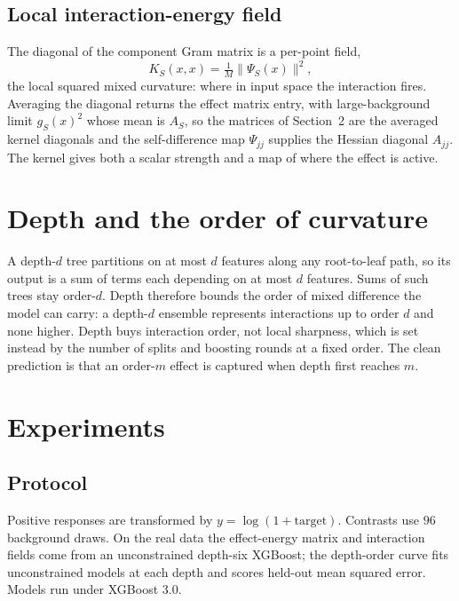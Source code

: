 \documentclass[11pt]{article}
\begin{document}
\subsection{Local interaction-energy field}

The diagonal of the component Gram matrix is a per-point field,
\begin{equation}
 K_S(x,x)=\tfrac1M\lVert\Psi_S(x)\rVert^2,
\end{equation}
the local squared mixed curvature: where in input space the interaction fires.
Averaging the diagonal returns the effect matrix entry, with large-background
limit $g_S(x)^2$ whose mean is $A_S$, so the matrices of Section~2 are the averaged
kernel diagonals and the self-difference map $\Psi_{jj}$ supplies the Hessian
diagonal $A_{jj}$. The kernel gives both a scalar strength and a map of where the
effect is active.

\section{Depth and the order of curvature}

A depth-$d$ tree partitions on at most $d$ features along any root-to-leaf path, so
its output is a sum of terms each depending on at most $d$ features. Sums of such
trees stay order-$d$. Depth therefore bounds the order of mixed difference the
model can carry: a depth-$d$ ensemble represents interactions up to order $d$ and
none higher. Depth buys interaction order, not local sharpness, which is set
instead by the number of splits and boosting rounds at a fixed order. The clean
prediction is that an order-$m$ effect is captured when depth first reaches $m$.

\section{Experiments}

\subsection{Protocol}

Positive responses are transformed by $y=\log(1+\text{target})$. Contrasts use $96$
background draws. On the real data the effect-energy matrix and interaction fields
come from an unconstrained depth-six XGBoost; the depth-order curve fits
unconstrained models at each depth and scores held-out mean squared error. Models
run under XGBoost 3.0.
\end{document}

